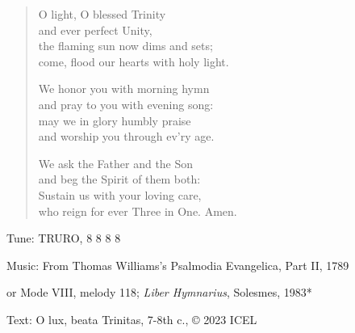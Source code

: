\hymn

\begin{verse}
O light, O blessed Trinity\\
and ever perfect Unity,\\
the flaming sun now dims and sets;\\
come, flood our hearts with holy light.

We honor you with morning hymn\\
and pray to you with evening song:\\
may we in glory humbly praise\\
and worship you through ev’ry age.

We ask the Father and the Son\\
and beg the Spirit of them both:\\
Sustain us with your loving care,\\
who reign for ever Three in One. Amen.
\end{verse}

\begin{hymnsource}
Tune: TRURO, 8 8 8 8

Music: From Thomas Williams’s Psalmodia Evangelica, Part II, 1789

or Mode VIII, melody 118; \emph{Liber Hymnarius}, Solesmes, 1983*

Text: O lux, beata Trinitas, 7-8th c., © 2023 ICEL
\end{hymnsource}